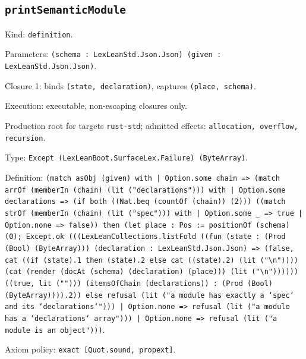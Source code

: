 \documentclass[11pt]{article}
\begin{document}
\subsection*{\texttt{printSemanticModule}}
\noindent Kind: \texttt{definition}.\par
\noindent Parameters: \texttt{(schema : LexLeanStd.Json.Json) (given : LexLeanStd.Json.Json)}.\par
\noindent Closure 1: binds \texttt{(state, declaration)}, captures \texttt{(place, schema)}.\par
\noindent Execution: executable, non-escaping closures only.\par
\noindent Production root for targets \texttt{rust-std}; admitted effects: \texttt{allocation, overflow, recursion}.\par
\noindent Type: \texttt{Except (LexLeanBoot.SurfaceLex.Failure) (ByteArray)}.\par
\noindent Definition: \texttt{(match asObj (given) with | Option.some chain => (match arrOf (memberIn (chain) (lit ("declarations"))) with | Option.some declarations => (if both ((Nat.beq (countOf (chain)) (2))) ((match strOf (memberIn (chain) (lit ("spec"))) with | Option.some \_ => true | Option.none => false)) then (let place : Pos := positionOf (schema) (0); Except.ok (((LexLeanCollections.listFold ((fun (state : (Prod (Bool) (ByteArray))) (declaration : LexLeanStd.Json.Json) => (false, cat ((if (state).1 then (state).2 else cat ((state).2) (lit ("\textbackslash{}n")))) (cat (render (docAt (schema) (declaration) (place))) (lit ("\textbackslash{}n")))))) ((true, lit (""))) (itemsOfChain (declarations)) : (Prod (Bool) (ByteArray)))).2)) else refusal (lit ("a module has exactly a `spec` and its `declarations`"))) | Option.none => refusal (lit ("a module has a `declarations` array"))) | Option.none => refusal (lit ("a module is an object")))}.\par
\noindent Axiom policy: \texttt{exact [Quot.sound, propext]}.\par
\end{document}
